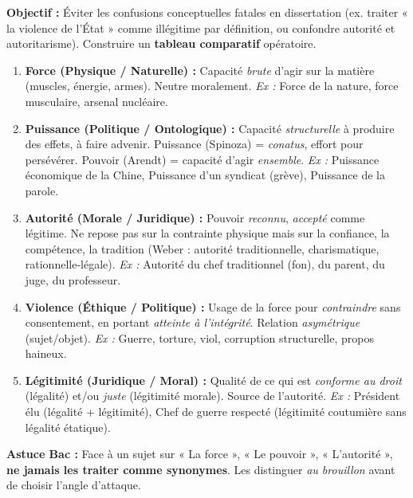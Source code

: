 \documentclass[11pt]{article}
\newcommand{\cle}[1]{{\popxbold\color{popdark}#1}}
\begin{document}
\begin{methode}
\textbf{Objectif :} Éviter les \cle{confusions conceptuelles} fatales en dissertation (ex. traiter « la violence de l'État » comme illégitime par définition, ou confondre autorité et autoritarisme). Construire un \textbf{tableau comparatif} opératoire.
\begin{enumerate}
    \item \textbf{Force (Physique / Naturelle) :} Capacité \emph{brute} d'agir sur la matière (muscles, énergie, armes). Neutre moralement. \emph{Ex :} Force de la nature, force musculaire, arsenal nucléaire.
    \item \textbf{Puissance (Politique / Ontologique) :} Capacité \emph{structurelle} à produire des effets, à faire advenir. \cle{Puissance} (Spinoza) = \emph{conatus}, effort pour persévérer. \cle{Pouvoir} (Arendt) = capacité d'agir \emph{ensemble}. \emph{Ex :} Puissance économique de la Chine, Puissance d'un syndicat (grève), Puissance de la parole.
    \item \textbf{Autorité (Morale / Juridique) :} Pouvoir \emph{reconnu}, \emph{accepté} comme légitime. Ne repose pas sur la contrainte physique mais sur la \cle{confiance}, la \cle{compétence}, la \cle{tradition} (Weber : autorité traditionnelle, charismatique, rationnelle-légale). \emph{Ex :} Autorité du chef traditionnel (fon), du parent, du juge, du professeur.
    \item \textbf{Violence (Éthique / Politique) :} Usage de la \cle{force} pour \emph{contraindre} sans consentement, en portant \emph{atteinte à l'intégrité}. Relation \emph{asymétrique} (sujet/objet). \emph{Ex :} Guerre, torture, viol, corruption structurelle, propos haineux.
    \item \textbf{Légitimité (Juridique / Moral) :} Qualité de ce qui est \emph{conforme au droit} (légalité) et/ou \emph{juste} (légitimité morale). \cle{Source} de l'autorité. \emph{Ex :} Président élu (légalité + légitimité), Chef de guerre respecté (légitimité coutumière sans légalité étatique).
\end{enumerate}
\textbf{Astuce Bac :} Face à un sujet sur « La force », « Le pouvoir », « L'autorité », \textbf{ne jamais les traiter comme synonymes}. Les distinguer \emph{au brouillon} avant de choisir l'angle d'attaque.
\end{methode}
\end{document}
